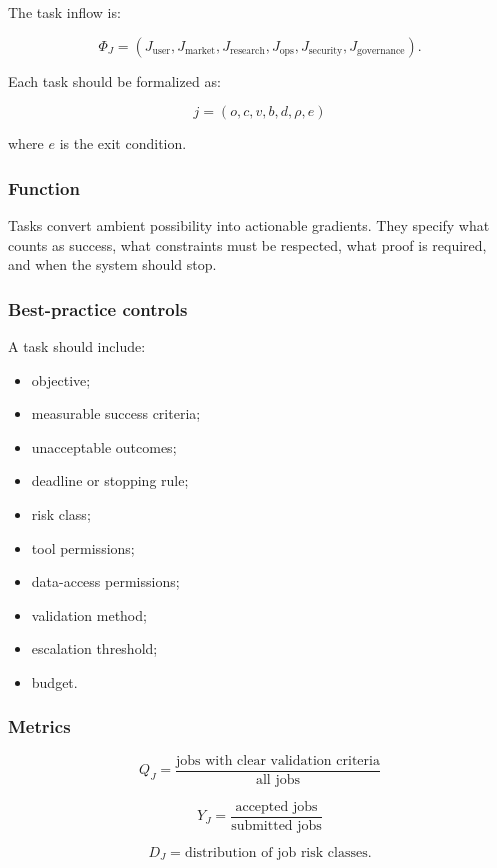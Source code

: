 \documentclass[11pt]{article}
\providecommand{\tightlist}{\setlength{\itemsep}{0pt}\setlength{\parskip}{0pt}}
\begin{document}
The task inflow is:

\[
\Phi_J=(J_{\text{user}},J_{\text{market}},J_{\text{research}},J_{\text{ops}},J_{\text{security}},J_{\text{governance}}).
\]

Each task should be formalized as:

\[
j=(o,c,v,b,d,\rho,e)
\]

where \(e\) is the exit condition.

\subsubsection{Function}\label{function-2}

Tasks convert ambient possibility into actionable gradients. They
specify what counts as success, what constraints must be respected, what
proof is required, and when the system should stop.

\subsubsection{Best-practice controls}\label{best-practice-controls-2}

A task should include:

\begin{itemize}
\tightlist
\item
  objective;
\item
  measurable success criteria;
\item
  unacceptable outcomes;
\item
  deadline or stopping rule;
\item
  risk class;
\item
  tool permissions;
\item
  data-access permissions;
\item
  validation method;
\item
  escalation threshold;
\item
  budget.
\end{itemize}

\subsubsection{Metrics}\label{metrics-2}

\[
Q_J=\frac{\text{jobs with clear validation criteria}}{\text{all jobs}}
\]

\[
Y_J=\frac{\text{accepted jobs}}{\text{submitted jobs}}
\]

\[
D_J=\text{distribution of job risk classes}.
\]
\end{document}
